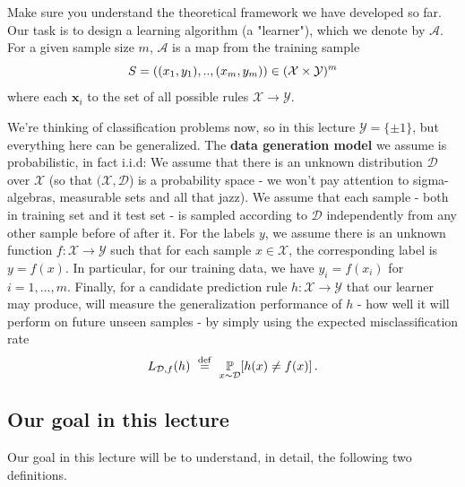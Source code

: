 {Make sure you understand the theoretical framework we have developed so far. Our task is to design a learning algorithm (a "learner"), which we denote by $\mathcal{A}$. For a given sample size $m$, $\mathcal{A}$  is a map from the training sample 
\[S=((x_1,y_1),..,(x_m,y_m)) \in (\mathcal{X}\times \mathcal{Y})^m\]
where each $\mathbf{x}_i$
to the set of all possible rules $\mathcal{X}\to\mathcal{Y}$. 

We're thinking of classification problems now, so in this lecture $\mathcal{Y}=\{\pm 1\}$, but everything here can be generalized. The {\bf data generation model} we assume is probabilistic, in fact i.i.d: We assume that there is an unknown distribution $\mathcal{D}$ over $\mathcal{X}$ (so that $(\mathcal{X},\mathcal{D}$) is a probability space - we won't pay attention to sigma-algebras, measurable sets and all that jazz). We assume that each sample - both in training set and it test set - is sampled according to $\mathcal{D}$ independently from any other sample before of after it. For the labels $y$, we assume there is an unknown function $f:\mathcal{X}\to\mathcal{Y}$ such that for each sample $x\in\mathcal{X}$, the corresponding label is $y=f(x)$.
In particular, for our training data, we have $y_i = f(x_i)$ for $i=1,\ldots,m$. Finally, for a candidate prediction rule $h:\mathcal{X}\to\mathcal{Y}$ that our learner may produce,  will measure the generalization performance of $h$ - how well it will perform on future unseen samples - by simply using the expected misclassification rate 
$$
L_{\mathcal{D},f}(h) ~\stackrel{\mathrm{def}}{=}~ \operatorname*{\mathbb{P}}_{x \sim \mathcal{D}}[h(x) \neq f(x)] \,.
$$

\subsection{Our goal in this lecture}

Our goal in this lecture will be to understand, in detail, the following two definitions.

}
